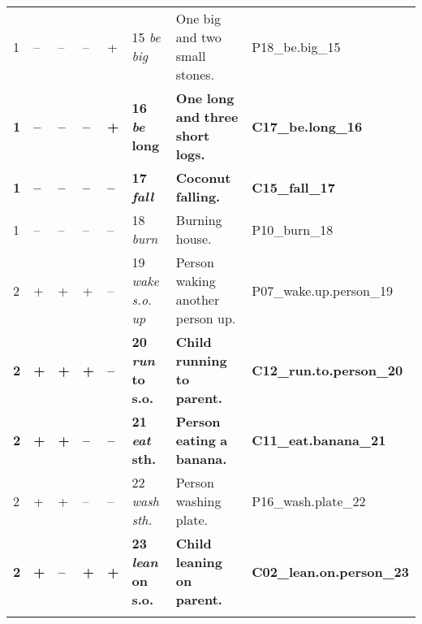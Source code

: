 \begin{tabularx}{\textwidth}{llllllQl}
1 		& -- 	& -- 		& -- 		& + 		& 15 		\textit{be big}& One big and two small stones.					&  P18\_be.big\_15  \\
\textbf{1} 	& \textbf{--}& \textbf{--} & \textbf{--}& \textbf{+}& \textbf{16} 	\textbf{\textit{be} \textbf{long}}& \textbf{One} \textbf{long} \textbf{and} \textbf{three} \textbf{short} \textbf{logs.} & \textbf{C17\_be.long\_16} \\
\textbf{1} 	& \textbf{--}& \textbf{--} & \textbf{--}& \textbf{--} & \textbf{17} 	\textbf{\textit{fall}}& \textbf{Coconut} \textbf{falling.}			&  \textbf{C15\_fall\_17}  \\
1 		& -- 	& -- 		& -- 		& -- 		& 18 		\textit{burn}& Burning house. 					& P10\_burn\_18 \\
2 		& + 		& + 		& + 		& -- 		& 19 		\textit{wake s.o. up}& Person waking another person up.				&  P07\_wake.up.person\_19  \\
\textbf{2} 	& \textbf{+} 	& \textbf{+} 	& \textbf{+} 	& \textbf{--} 	& \textbf{20} 	\textbf{\textit{run} \textbf{to} \textbf{s.o.}}& \textbf{Child} \textbf{running} \textbf{to} \textbf{parent.} & \textbf{C12\_run.to.person\_20} \\
\textbf{2} 	& \textbf{+} 	& \textbf{+} 	& \textbf{--} & \textbf{--} 	& \textbf{21} \textbf{\textit{eat} \textbf{sth.}} &\textbf{Person} \textbf{eating} \textbf{a} \textbf{banana.} & \textbf{C11\_eat.banana\_21} \\
2 		& + 		& + 		& -- 		& -- 		& 22 		\textit{wash sth.} &Person washing plate.					&   P16\_wash.plate\_22 \\
\textbf{2} 	& \textbf{+} 	& \textbf{--} & \textbf{+} 	& \textbf{+} & \textbf{23} 	\textbf{\textit{lean} \textbf{on} \textbf{s.o.}} & \textbf{Child} \textbf{leaning} \textbf{on} \textbf{parent.} & \textbf{C02\_lean.on.person\_23}  \\
\lspbottomrule
\end{tabularx}

